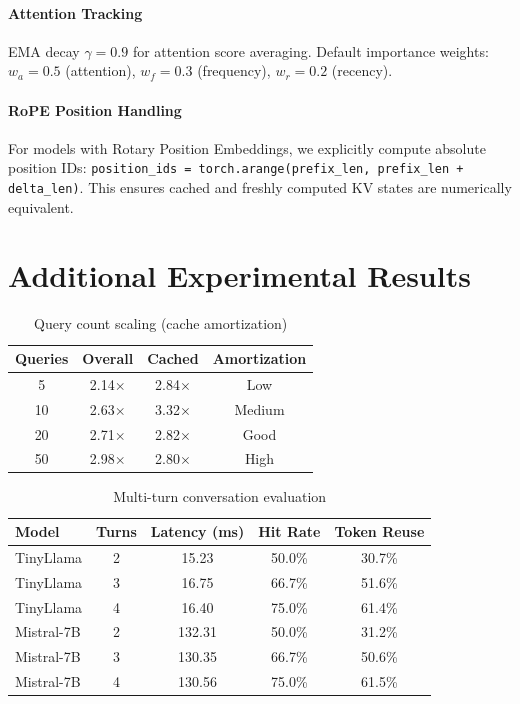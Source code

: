 \documentclass{article}
\begin{document}
\paragraph{Attention Tracking}
EMA decay $\gamma=0.9$ for attention score averaging.
Default importance weights: $w_a=0.5$ (attention), $w_f=0.3$ (frequency), $w_r=0.2$ (recency).

\paragraph{RoPE Position Handling}
For models with Rotary Position Embeddings, we explicitly compute absolute position IDs:
\texttt{position\_ids = torch.arange(prefix\_len, prefix\_len + delta\_len)}.
This ensures cached and freshly computed KV states are numerically equivalent.

\section{Additional Experimental Results}
\label{app:results}

\begin{table}[h]
\centering
\caption{Query count scaling (cache amortization)}
\small
\begin{tabular}{cccc}
\toprule
Queries & Overall & Cached & Amortization \\
\midrule
5 & 2.14$\times$ & 2.84$\times$ & Low \\
10 & 2.63$\times$ & 3.32$\times$ & Medium \\
20 & 2.71$\times$ & 2.82$\times$ & Good \\
50 & 2.98$\times$ & 2.80$\times$ & High \\
\bottomrule
\end{tabular}
\end{table}

\begin{table}[h]
\centering
\caption{Multi-turn conversation evaluation}
\small
\begin{tabular}{lcccc}
\toprule
Model & Turns & Latency (ms) & Hit Rate & Token Reuse \\
\midrule
TinyLlama & 2 & 15.23 & 50.0\% & 30.7\% \\
TinyLlama & 3 & 16.75 & 66.7\% & 51.6\% \\
TinyLlama & 4 & 16.40 & 75.0\% & 61.4\% \\
\midrule
Mistral-7B & 2 & 132.31 & 50.0\% & 31.2\% \\
Mistral-7B & 3 & 130.35 & 66.7\% & 50.6\% \\
Mistral-7B & 4 & 130.56 & 75.0\% & 61.5\% \\
\bottomrule
\end{tabular}
\end{table}
\end{document}
